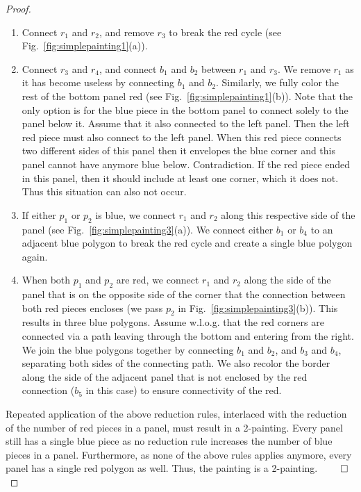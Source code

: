 \documentclass[runningheads]{llncs}
\begin{document}
\begin{proof}
	\begin{enumerate}
		\item Connect $r_1$ and $r_2$, and remove $r_3$ to break the red cycle (see Fig.~\ref{fig:simplepainting1}(a)).
		\item Connect $r_3$ and $r_4$, and connect $b_1$ and $b_2$ between $r_1$ and $r_3$.
                  We remove $r_1$ as it has become useless by connecting $b_1$ and $b_2$.
                  Similarly, we fully color the rest of the bottom panel red (see Fig.~\ref{fig:simplepainting1}(b)).
                  Note that the only option is for the blue piece in the bottom panel to connect solely to the panel below it. Assume that it also connected to the left panel. Then the left red piece must also connect to the left panel. When this red piece connects two different sides of this panel then it envelopes the blue corner and this panel cannot have anymore blue below. Contradiction. If the red piece ended in this panel, then it should include at least one corner, which it does not. Thus this situation can also not occur.
		\item If either $p_1$ or $p_2$ is blue, we connect $r_1$ and $r_2$ along this respective side of the panel (see Fig.~\ref{fig:simplepainting3}(a)). We connect either $b_1$ or $b_4$ to an adjacent blue polygon to break the red cycle and create a single blue polygon again.
		
\item When both $p_1$ and $p_2$ are red, we connect $r_1$ and $r_2$ along the side of the panel that is on the opposite side of the corner that the connection between both red pieces encloses (we pass $p_2$ in Fig.~\ref{fig:simplepainting3}(b)). This results in three blue polygons.
    Assume w.l.o.g. that the red corners are connected via a path leaving through the bottom and entering from the right.
    We join the blue polygons together by connecting $b_1$ and $b_2$, and $b_3$ and $b_4$, separating both sides of the connecting path.
We also recolor the border along the side of the adjacent panel that is not enclosed by the red connection ($b_5$ in this case) to ensure connectivity of the red.
	\end{enumerate}

Repeated application of the above reduction rules, interlaced with the reduction of the number of red pieces in a panel, must result in a 2-painting.
Every panel still has a single blue piece as no reduction rule increases the number of blue pieces in a panel.
Furthermore, as none of the above rules applies anymore, every panel has a single red polygon as well.
Thus, the painting is a 2-painting.
	\hfill$\qed$
\end{proof}
\end{document}
